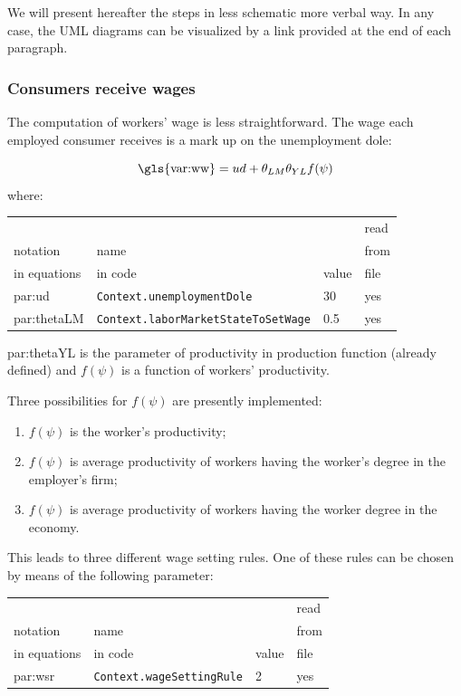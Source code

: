 \documentclass{book}
\begin{document}
We will present hereafter the steps in less schematic more verbal way. In any case, the UML diagrams can be visualized by a link provided at the end of each paragraph.

\subsubsection{Consumers receive wages}

The computation of workers' wage is less straightforward. The wage each employed consumer receives is a mark up on the unemployment dole: 

\begin{equation}
	\textnormal{\gls{var:ww}}=ud+\theta_{LM}\theta_{YL}f(\psi)
	\label{eq:ww}
\end{equation}
where:\\

\vskip2mm
\noindent
\begin{tabular}{l l l l}
	\hline
	& &&read\\
	notation& name &&from\\
	in equations& in code&value&file\\
	\hline
	\hline
\gls{par:ud}&\verb+Context.unemploymentDole+&30&yes\\
\gls{par:thetaLM}&\verb+Context.laborMarketStateToSetWage+&0.5&yes\\
	\hline
\end{tabular}

\vskip2mm
\gls{par:thetaYL} is the parameter of productivity in production function (already defined) and $f(\psi)$ is a function of workers' productivity.

Three possibilities for $f(\psi)$ are presently implemented:
\begin{enumerate}
	\item $f(\psi)$ is the worker's productivity;
	\item $f(\psi)$ is average productivity of workers having the worker's degree in the employer's firm;
	\item $f(\psi)$ is average productivity of workers having the worker degree in the economy.
\end{enumerate}


This leads to three different wage setting rules. One of these rules can be chosen by means of the following parameter:\\
\vskip2mm
\noindent
\begin{tabular}{l l l l}
	\hline
	& &&read\\
	notation& name &&from\\
	in equations& in code&value&file\\
	\hline
	\hline
\gls{par:wsr}&\verb+Context.wageSettingRule+&2&yes\\
	\hline
\end{tabular}
\end{document}
